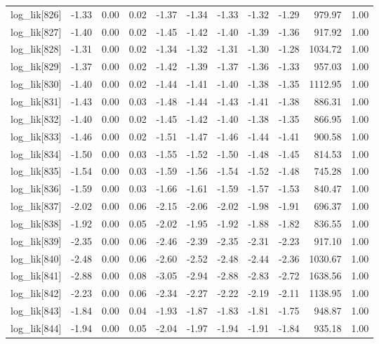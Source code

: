 \begin{table}[ht]
\begin{tabular}{rrrrrrrrrrr}
  log\_lik[826] & -1.33 & 0.00 & 0.02 & -1.37 & -1.34 & -1.33 & -1.32 & -1.29 & 979.97 & 1.00 \\ 
  log\_lik[827] & -1.40 & 0.00 & 0.02 & -1.45 & -1.42 & -1.40 & -1.39 & -1.36 & 917.92 & 1.00 \\ 
  log\_lik[828] & -1.31 & 0.00 & 0.02 & -1.34 & -1.32 & -1.31 & -1.30 & -1.28 & 1034.72 & 1.00 \\ 
  log\_lik[829] & -1.37 & 0.00 & 0.02 & -1.42 & -1.39 & -1.37 & -1.36 & -1.33 & 957.03 & 1.00 \\ 
  log\_lik[830] & -1.40 & 0.00 & 0.02 & -1.44 & -1.41 & -1.40 & -1.38 & -1.35 & 1112.95 & 1.00 \\ 
  log\_lik[831] & -1.43 & 0.00 & 0.03 & -1.48 & -1.44 & -1.43 & -1.41 & -1.38 & 886.31 & 1.00 \\ 
  log\_lik[832] & -1.40 & 0.00 & 0.02 & -1.45 & -1.42 & -1.40 & -1.38 & -1.35 & 866.95 & 1.00 \\ 
  log\_lik[833] & -1.46 & 0.00 & 0.02 & -1.51 & -1.47 & -1.46 & -1.44 & -1.41 & 900.58 & 1.00 \\ 
  log\_lik[834] & -1.50 & 0.00 & 0.03 & -1.55 & -1.52 & -1.50 & -1.48 & -1.45 & 814.53 & 1.00 \\ 
  log\_lik[835] & -1.54 & 0.00 & 0.03 & -1.59 & -1.56 & -1.54 & -1.52 & -1.48 & 745.28 & 1.00 \\ 
  log\_lik[836] & -1.59 & 0.00 & 0.03 & -1.66 & -1.61 & -1.59 & -1.57 & -1.53 & 840.47 & 1.00 \\ 
  log\_lik[837] & -2.02 & 0.00 & 0.06 & -2.15 & -2.06 & -2.02 & -1.98 & -1.91 & 696.37 & 1.00 \\ 
  log\_lik[838] & -1.92 & 0.00 & 0.05 & -2.02 & -1.95 & -1.92 & -1.88 & -1.82 & 836.55 & 1.00 \\ 
  log\_lik[839] & -2.35 & 0.00 & 0.06 & -2.46 & -2.39 & -2.35 & -2.31 & -2.23 & 917.10 & 1.00 \\ 
  log\_lik[840] & -2.48 & 0.00 & 0.06 & -2.60 & -2.52 & -2.48 & -2.44 & -2.36 & 1030.67 & 1.00 \\ 
  log\_lik[841] & -2.88 & 0.00 & 0.08 & -3.05 & -2.94 & -2.88 & -2.83 & -2.72 & 1638.56 & 1.00 \\ 
  log\_lik[842] & -2.23 & 0.00 & 0.06 & -2.34 & -2.27 & -2.22 & -2.19 & -2.11 & 1138.95 & 1.00 \\ 
  log\_lik[843] & -1.84 & 0.00 & 0.04 & -1.93 & -1.87 & -1.83 & -1.81 & -1.75 & 948.87 & 1.00 \\ 
  log\_lik[844] & -1.94 & 0.00 & 0.05 & -2.04 & -1.97 & -1.94 & -1.91 & -1.84 & 935.18 & 1.00 \\ 

\end{tabular}
\end{table}
